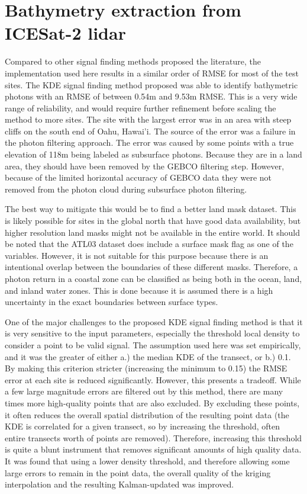 

\section{Bathymetry extraction from ICESat-2 lidar}

Compared to other signal finding methods proposed the literature, the implementation used here results in a similar order of RMSE for most of the test sites. The KDE signal finding method proposed was able to identify bathymetric photons with an RMSE of between 0.54m and 9.53m RMSE. This is a very wide range of reliability, and would require further refinement before scaling the method to more sites. The site with the largest error was in an area with steep cliffs on the south end of Oahu, Hawai'i. The source of the error was a failure in the photon filtering approach. The error was caused by some points with a true elevation of 118m being labeled as subsurface photons. Because they are in a land area, they should have been removed by the GEBCO filtering step. However, because of the limited horizontal accuracy of GEBCO data they were not removed from the photon cloud during subsurface photon filtering.

The best way to mitigate this would be to find a better land mask dataset. This is likely possible for sites in the global north that have good data availability, but higher resolution land masks might not be available in the entire world. It should be noted that the ATL03 dataset does include a surface mask flag as one of the variables. However, it is not suitable for this purpose because there is an intentional overlap between the boundaries of these different masks. Therefore, a photon return in a coastal zone can be classified as being both in the ocean, land, and inland water zones. This is done because it is assumed there is a high uncertainty in the exact boundaries between surface types. 

One of the major challenges to the proposed KDE signal finding method is that it is very sensitive to the input parameters, especially the threshold local density to consider a point to be valid signal. The assumption used here was set empirically, and it was the greater of either a.) the median KDE of the transect, or b.) 0.1. By making this criterion stricter (increasing the minimum to 0.15) the RMSE error at each site is reduced significantly. However, this presents a tradeoff. While a few large magnitude errors are filtered out by this method, there are many times more high-quality points that are also excluded. By excluding these points, it often reduces the overall spatial distribution of the resulting point data (the KDE is correlated for a given transect, so by increasing the threshold, often entire transects worth of points are removed). Therefore, increasing this threshold is quite a blunt instrument that removes significant amounts of high quality data. It was found that using a lower density threshold, and therefore allowing some large errors to remain in the point data, the overall quality of the kriging interpolation and the resulting Kalman-updated was improved. 

